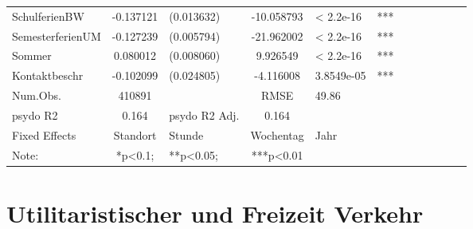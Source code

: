 \documentclass[a4paper,12pt]{thesis}
\begin{document}
\begin{table}[!ht]
\begin{tabular}[t]{lc lc lc lc lc lc}
		SchulferienBW & -0.137121 & (0.013632) & -10.058793 & < 2.2e-16 & *** \\
		SemesterferienUM & -0.127239 & (0.005794) & -21.962002 & < 2.2e-16 & *** \\
		Sommer & 0.080012 & (0.008060) & 9.926549 & < 2.2e-16 & *** \\
		Kontaktbeschr & -0.102099 & (0.024805) & -4.116008 & 3.8549e-05 & *** \\
		\midrule
		Num.Obs. & 410891& & RMSE & 49.86 & \\
		psydo R2 & 0.164 & psydo R2 Adj. & 0.164 &  & \\
		\bottomrule
		Fixed Effects & Standort & Stunde & Wochentag & Jahr & \\
		Note: & *p<0.1; & **p<0.05; &***p<0.01 & &\\
	\end{tabular}
\end{table}


\section{Utilitaristischer und Freizeit Verkehr}
\end{document}
